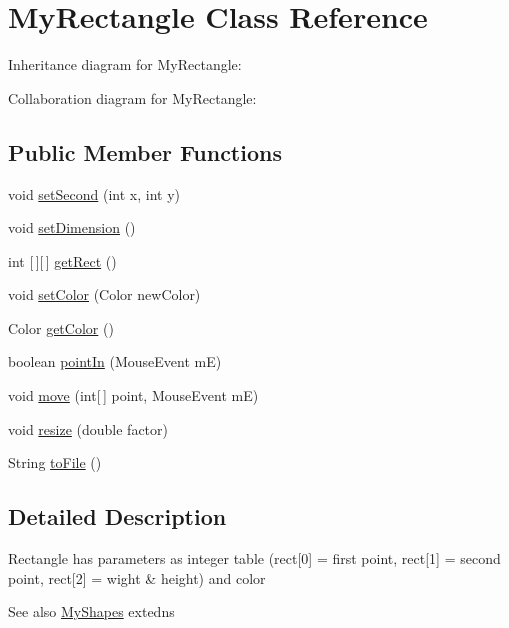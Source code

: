 \hypertarget{classMyRectangle}{}\section{My\+Rectangle Class Reference}
\label{classMyRectangle}


Inheritance diagram for My\+Rectangle\+:


Collaboration diagram for My\+Rectangle\+:
\subsection*{Public Member Functions}
\begin{DoxyCompactItemize}
\item 
void \hyperlink{classMyRectangle_a1b6b7e4441b7cd829efd34ee6d6c0fc0}{set\+Second} (int x, int y)
\item 
void \hyperlink{classMyRectangle_a78c344cb3911a767111bdbd491643f74}{set\+Dimension} ()
\item 
int \mbox{[}$\,$\mbox{]}\mbox{[}$\,$\mbox{]} \hyperlink{classMyRectangle_ab2ba4d93bf3671b4629a75b9d646a7b9}{get\+Rect} ()
\item 
void \hyperlink{classMyRectangle_a8ed586f377fb2c1a7733059ce53c5c2f}{set\+Color} (Color new\+Color)
\item 
Color \hyperlink{classMyRectangle_af6efeaa07a083d3f0eb6a6b614897aa2}{get\+Color} ()
\item 
boolean \hyperlink{classMyRectangle_a5e7f41339388f6f504f539ff12fca406}{point\+In} (Mouse\+Event mE)
\item 
void \hyperlink{classMyRectangle_ac48d581b14240a51851f3e7ef992bdac}{move} (int\mbox{[}$\,$\mbox{]} point, Mouse\+Event mE)
\item 
void \hyperlink{classMyRectangle_a1e7f44c895f256f811c021e04147df5d}{resize} (double factor)
\item 
String \hyperlink{classMyRectangle_a90aada4c72564c4fdd5175f4c8614291}{to\+File} ()
\end{DoxyCompactItemize}


\subsection{Detailed Description}
Rectangle has parameters as integer table (rect\mbox{[}0\mbox{]} = first point, rect\mbox{[}1\mbox{]} = second point, rect\mbox{[}2\mbox{]} = wight \& height) and color \begin{DoxySeeAlso}{See also}
\hyperlink{classMyShapes}{My\+Shapes} extedns 
\end{DoxySeeAlso}


